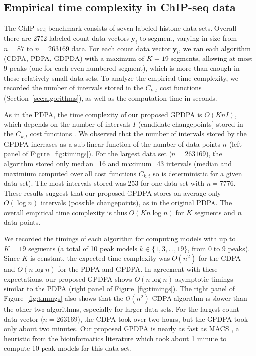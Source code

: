 \documentclass[twoside,11pt]{article}
\begin{document}
\subsection{Empirical time complexity in ChIP-seq data}
\label{sec:results_time}

The ChIP-seq benchmark consists of seven labeled histone data
sets.
Overall there are 2752 labeled count data vectors $\mathbf y_i$ to segment,
varying in size from $n=87$ to $n=263169$ data. For each count data
vector $\mathbf y_i$, we ran each algorithm (CDPA, PDPA, GDPDA) with a
maximum of $K=19$ segments, allowing at most 9 peaks (one for
each even-numbered segment), which is more than enough in these
relatively small data sets. To analyze the empirical time complexity,
we recorded the number of intervals stored in the $C_{k,t}$ cost
functions (Section~\ref{sec:algorithms}), as well as the computation
time in seconds.


As in the PDPA, the time complexity of our proposed GPDPA is
$O(K n I)$, which depends on the number of intervals $I$ (candidate
changepoints) stored in the $C_{k,t}$ cost functions
\citep{pruned-dp-new}. We observed that the number of intervals stored
by the GPDPA increases as a sub-linear function of the number of data
points $n$ (left panel of Figure~\ref{fig:timings}). For the largest data
set ($n=263169$), the algorithm stored only median=16 and maximum=43
intervals (median and maximium computed over all cost functions
$C_{k,t}$ so is deterministic for a given data set). The most
intervals stored was 253 for one data set with $n=7776$. These results
suggest that our proposed GPDPA stores on average only $O(\log n)$
intervals (possible changepoints), as in the original PDPA. The
overall empirical time complexity is thus $O(K n \log n)$ for $K$
segments and $n$ data points.

We recorded the timings of each algorithm for computing models with up
to $K=19$ segments (a total of 10 peak models $k\in\{1,3,\dots,19\}$,
from 0 to 9 peaks). Since $K$ is constant, the expected time
complexity was $O(n^2)$ for the CDPA and $O(n \log n)$ for the PDPA
and GPDPA. In agreement with these expectations, our proposed GPDPA
shows $O(n\log n)$ asymptotic timings similar to the PDPA (right panel of
Figure~\ref{fig:timings}). 
The right panel of
Figure~\ref{fig:timings} also shows that the $O(n^2)$ CDPA algorithm is slower than the other
two algorithms, especially for larger data sets. For the largest count
data vector ($n=263169$), the CDPA took over two hours, but the GPDPA
took only
about two minutes. Our proposed GPDPA is nearly as fast as MACS
\citep{MACS}, a heuristic from the bioinformatics literature which
took about 1 minute to compute 10 peak models for this data set. 
\end{document}
